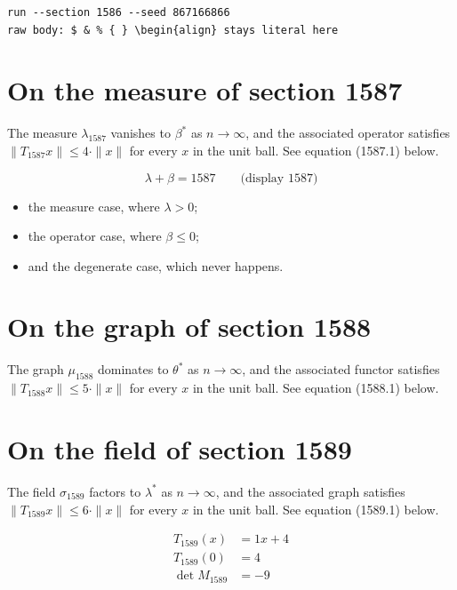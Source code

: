 \documentclass{article}
\begin{document}
\begin{verbatim}
run --section 1586 --seed 867166866
raw body: $ & % { } \begin{align} stays literal here
\end{verbatim}

\section{On the measure of section 1587}
The measure $\lambda_{1587}$ vanishes to $\beta^{*}$ as $n \to \infty$,
and the associated operator satisfies $\|T_{1587} x\| \leq 4 \cdot \|x\|$
for every $x$ in the unit ball. See equation (1587.1) below.

$$
\lambda + \beta = 1587 \qquad \text{(display 1587)}
$$

\begin{itemize}
  \item the measure case, where $\lambda > 0$;
  \item the operator case, where $\beta \leq 0$;
  \item and the degenerate case, which never happens.
\end{itemize}

\section{On the graph of section 1588}
The graph $\mu_{1588}$ dominates to $\theta^{*}$ as $n \to \infty$,
and the associated functor satisfies $\|T_{1588} x\| \leq 5 \cdot \|x\|$
for every $x$ in the unit ball. See equation (1588.1) below.

\section{On the field of section 1589}
The field $\sigma_{1589}$ factors to $\lambda^{*}$ as $n \to \infty$,
and the associated graph satisfies $\|T_{1589} x\| \leq 6 \cdot \|x\|$
for every $x$ in the unit ball. See equation (1589.1) below.

\begin{align}
T_{1589}(x) &= 1 x + 4 \\
T_{1589}(0) &= 4 \\
\det M_{1589} &= -9
\end{align}
\end{document}
